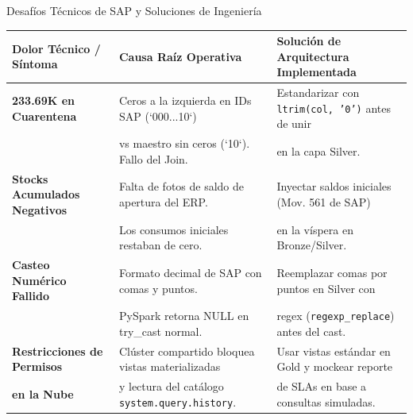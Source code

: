 \documentclass[aspectratio=169,10pt]{beamer}
\begin{document}
\begin{frame}{Desafíos Técnicos de SAP y Soluciones de Ingeniería}
    \small
    \begin{table}[h]
        \begin{tabular}{lll}
            \toprule
            \textbf{Dolor Técnico / Síntoma} & \textbf{Causa Raíz Operativa} & \textbf{Solución de Arquitectura Implementada} \\
            \midrule
            \rowcolor{red!10} \textbf{233.69K en Cuarentena} & Ceros a la izquierda en IDs SAP (`000...10`) & Estandarizar con \texttt{ltrim(col, '0')} antes de unir \\
            & vs maestro sin ceros (`10`). Fallo del Join. & en la capa Silver. \\
            \midrule
            \rowcolor{red!10} \textbf{Stocks Acumulados Negativos} & Falta de fotos de saldo de apertura del ERP. & Inyectar saldos iniciales (Mov. 561 de SAP) \\
            & Los consumos iniciales restaban de cero. & en la víspera en Bronze/Silver. \\
            \midrule
            \rowcolor{red!10} \textbf{Casteo Numérico Fallido} & Formato decimal de SAP con comas y puntos. & Reemplazar comas por puntos en Silver con \\
            & PySpark retorna NULL en try\_cast normal. & regex (\texttt{regexp\_replace}) antes del cast. \\
            \midrule
            \rowcolor{red!10} \textbf{Restricciones de Permisos} & Clúster compartido bloquea vistas materializadas & Usar vistas estándar en Gold y mockear reporte \\
            \textbf{en la Nube} & y lectura del catálogo \texttt{system.query.history}. & de SLAs en base a consultas simuladas. \\
            \bottomrule
        \end{tabular}
    \end{table}
\end{frame}
\end{document}
